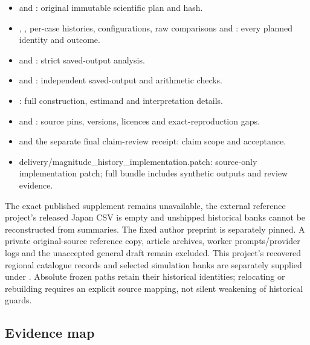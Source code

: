 \begin{itemize}
\item {} and : original immutable scientific plan and hash.
\item {}, , per-case histories, configurations, raw comparisons and : every planned identity and outcome.
\item {} and : strict saved-output analysis.
\item {} and : independent saved-output and arithmetic checks.
\item {}: full construction, estimand and interpretation details.
\item {} and : source pins, versions, licences and exact-reproduction gaps.
\item {} and the separate final claim-review receipt: claim scope and acceptance.
\item delivery/magnitude\_history\_implementation.patch: source-only implementation patch; full bundle includes synthetic outputs and review evidence.
\end{itemize}

The exact published supplement remains unavailable, the external reference project's released Japan CSV is empty and unshipped historical banks cannot be reconstructed from summaries. The fixed author preprint is separately pinned. A private original-source reference copy, article archives, worker prompts/provider logs and the unaccepted general draft remain excluded. This project's recovered regional catalogue records and selected simulation banks are separately supplied under . Absolute frozen paths retain their historical identities; relocating or rebuilding requires an explicit source mapping, not silent weakening of historical guards.

\subsection{Evidence map}
\label{app:audit09-pilot-evidence}


